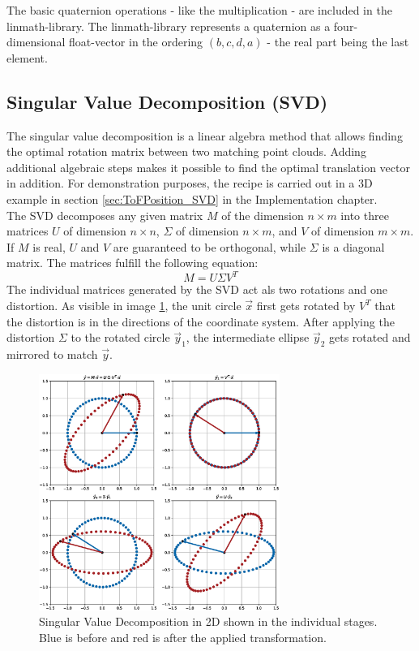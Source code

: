 The basic quaternion operations - like the multiplication - are included in the linmath-library. The linmath-library represents a quaternion as a four-dimensional float-vector in the ordering $(b, c, d, a)$ - the real part being the last element.\\

\subsection{Singular Value Decomposition (SVD)}
\label{sec:SVD}
The singular value decomposition is a linear algebra method that allows finding the optimal rotation matrix between two matching point clouds. Adding additional algebraic steps makes it possible to find the optimal translation vector in addition.\cite{SVD_ETH}
For demonstration purposes, the recipe is carried out in a 3D example in section \ref{sec:ToFPosition_SVD} in the Implementation chapter.\\
The SVD decomposes any given matrix $M$ of the dimension $n\times m$ into three matrices $U$ of dimension $n\times n$, $\Sigma$ of dimension $n\times m$, and $V$ of dimension $m\times m$.\cite{SVD_MIT} If $M$ is real, $U$ and $V$ are guaranteed to be orthogonal, while $\Sigma$ is a diagonal matrix. The matrices fulfill the following equation: 
\begin{equation*}
    M= U\Sigma V^{T}
\end{equation*}
The individual matrices generated by the SVD act als two rotations and one distortion. As visible in image \ref{im:SVD}, the unit circle $\vec{x}$ first gets rotated by $V^{T}$ that the distortion is in the directions of the coordinate system. After applying the distortion $\Sigma$ to the rotated circle $\vec{y}_{1}$, the intermediate ellipse $\vec{y}_{2}$ gets rotated and mirrored to match $\vec{y}$.
\begin{figure}[H]
    \centering
    \includegraphics[width=0.7\textwidth]{images/SVD}
    \caption{Singular Value Decomposition in 2D shown in the individual stages. Blue is before and red is after the applied transformation.}
    \label{im:SVD}
\end{figure}

